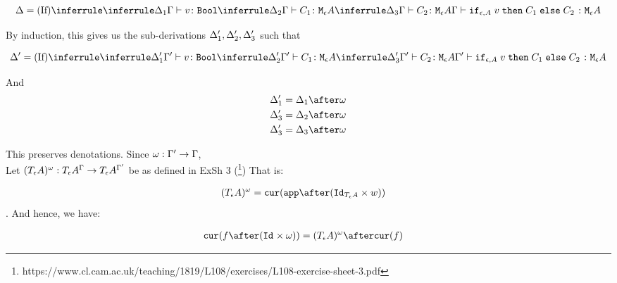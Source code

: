 {    
    \begin{equation}
        \D = \ntreeruleIII{If}{
            \treeruleI{\D_1}{\typerelation{\G}{v}{\B}}
            }{
            \treeruleI{\D_2}{\typerelation{\G}{C_1}{\mea}}
            }{
            \treeruleI{\D_3}{\typerelation{\G}{C_2}{\mea}}
        }{
            \typerelation{\G}{\ifthenelse{\e}{A}{v}{C_1}{C_2}}{\mea}
        }
    \end{equation}
    
    By induction, this gives us the sub-derivations $\Delta_1', \Delta_2', \Delta_3'$ such that
    
    \begin{equation}
        \D' = \ntreeruleIII{If}{
            \treeruleI{\D_1'}{\typerelation{\G'}{v}{\B}}
            }{
            \treeruleI{\D_2'}{\typerelation{\G'}{C_1}{\mea}}
            }{
            \treeruleI{\D_3'}{\typerelation{\G'}{C_2}{\mea}}
        }{
            \typerelation{\G'}{\ifthenelse{\e}{A}{v}{C_1}{C_2}}{\mea}
        }
    \end{equation}
    
    And 
    \begin{align}
        \D_1' & =\D_1 \after \w\\
        \D_3' & =\D_2 \after \w\\
        \D_3' & =\D_3 \after \w 
    \end{align}
    
    
    This preserves denotations.
    Since $\omega: \Gamma' \rightarrow \Gamma$, \\
    Let $(T_{\epsilon}{A})^{\omega}: T_{\epsilon}{A}^{\Gamma}\rightarrow T_{\epsilon}{A}^{\Gamma'}$ be as defined in ExSh 3 (\footnote{https://www.cl.cam.ac.uk/teaching/1819/L108/exercises/L108-exercise-sheet-3.pdf})
    That is:
    
    \begin{align}
        (\tea)^{\w} & = \cur{\app\after(\Id{\tea}\times w)}
    \end{align}.
    And hence, we have:
    
    \begin{align}
        \cur{f\after(\Id{}\times \w)} & = (\tea)^{\w} \after\cur{f}
    \end{align}
    
}
